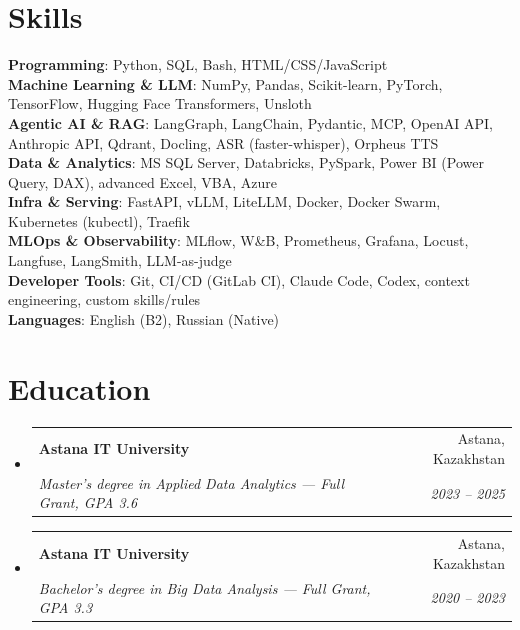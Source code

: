 \documentclass[letterpaper,11pt]{article}
\makeatletter
\newcommand{\resumeItem}[1]{
  \item\small{
    {#1 \vspace{-2pt}}
  }
}
\newcommand{\resumeSubheading}[4]{
  \vspace{-2pt}\item
    \begin{tabular*}{0.97\textwidth}[t]{l@{\extracolsep{\fill}}r}
      \textbf{#1} & #2 \\
      \textit{\small#3} & \textit{\small #4} \\
    \end{tabular*}\vspace{-7pt}
}
\newcommand{\resumeSubHeadingListStart}{\begin{itemize}[leftmargin=0.15in, label={}]}
\newcommand{\resumeSubHeadingListEnd}{\end{itemize}}
\newcommand{\resumeItemListStart}{\begin{itemize}}
\newcommand{\resumeItemListEnd}{\end{itemize}\vspace{-5pt}}
\makeatother
\begin{document}
\section{Skills}
 \begin{itemize}[leftmargin=0.15in, label={}]
    \small{\item{
     \textbf{Programming}{: Python, SQL, Bash, HTML/CSS/JavaScript} \\
     \textbf{Machine Learning \& LLM}{: NumPy, Pandas, Scikit-learn, PyTorch, TensorFlow, Hugging Face Transformers, Unsloth} \\
     \textbf{Agentic AI \& RAG}{: LangGraph, LangChain, Pydantic, MCP, OpenAI API, Anthropic API, Qdrant, Docling, ASR (faster-whisper), Orpheus TTS} \\
     \textbf{Data \& Analytics}{: MS SQL Server, Databricks, PySpark, Power BI (Power Query, DAX), advanced Excel, VBA, Azure} \\
     \textbf{Infra \& Serving}{: FastAPI, vLLM, LiteLLM, Docker, Docker Swarm, Kubernetes (kubectl), Traefik} \\
     \textbf{MLOps \& Observability}{: MLflow, W\&B, Prometheus, Grafana, Locust, Langfuse, LangSmith, LLM-as-judge} \\
     \textbf{Developer Tools}{: Git, CI/CD (GitLab CI), Claude Code, Codex, context engineering, custom skills/rules} \\
     \textbf{Languages}{: English (B2), Russian (Native)}
    }}
 \end{itemize}


\section{Education}
  \resumeSubHeadingListStart
    \resumeSubheading
      {Astana IT University}{Astana, Kazakhstan}
      {Master's degree in Applied Data Analytics --- Full Grant, GPA 3.6}{2023 -- 2025}
    \resumeSubheading
      {Astana IT University}{Astana, Kazakhstan}
      {Bachelor's degree in Big Data Analysis --- Full Grant, GPA 3.3}{2020 -- 2023}
  \resumeSubHeadingListEnd




\end{document}
